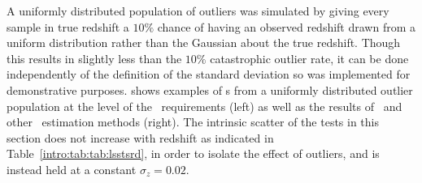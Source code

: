 A uniformly distributed population of outliers was simulated by giving every sample in true redshift a $10\%$ chance of having an observed redshift drawn from a uniform distribution rather than the Gaussian about the true redshift.
Though this results in slightly less than the $10\%$ catastrophic outlier rate, it can be done independently of the definition of the standard deviation so was implemented for demonstrative purposes.
 shows examples of \pzpdf s from a uniformly distributed outlier population at the level of the \lsst\ requirements (left) as well as the results of \Chippr\ and other \nz\ estimation methods (right).
The intrinsic scatter of the tests in this section does not increase with redshift as indicated in Table~\ref{intro:tab:tab:lsstsrd}, in order to isolate the effect of outliers, and is instead held at a constant $\sigma_{z} = 0.02$.

